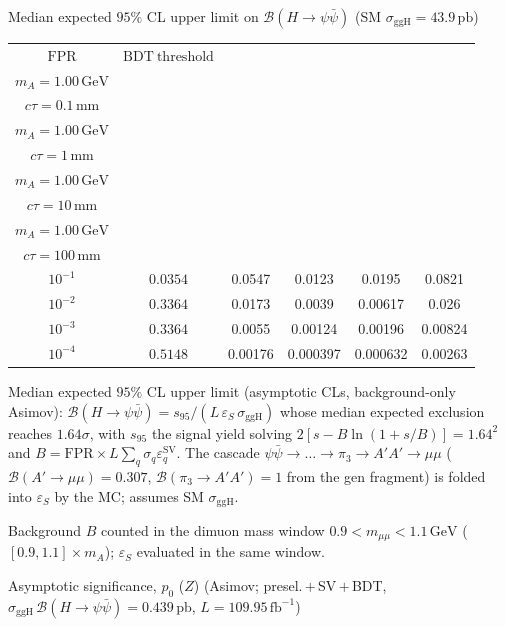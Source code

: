 \documentclass[10pt,a4paper]{article}
\begin{document}
{\vspace{12pt}

Median expected $95\%$ CL upper limit on $\mathcal{B}(H\to\psi\bar{\psi})$ (SM $\sigma_{\mathrm{ggH}}=43.9\,\mathrm{pb}$)

\begin{tabular}{cccccc}
\toprule
$\mathrm{FPR}$ & $\mathrm{BDT\ threshold}$ & \shortstack{$m_{\pi}=10\,\mathrm{GeV}$\\$m_{A}=1.00\,\mathrm{GeV}$\\$c\tau=0.1\,\mathrm{mm}$} & \shortstack{$m_{\pi}=10\,\mathrm{GeV}$\\$m_{A}=1.00\,\mathrm{GeV}$\\$c\tau=1\,\mathrm{mm}$} & \shortstack{$m_{\pi}=10\,\mathrm{GeV}$\\$m_{A}=1.00\,\mathrm{GeV}$\\$c\tau=10\,\mathrm{mm}$} & \shortstack{$m_{\pi}=10\,\mathrm{GeV}$\\$m_{A}=1.00\,\mathrm{GeV}$\\$c\tau=100\,\mathrm{mm}$} \\
\midrule
$10^{-1}$ & $0.0354$ & 0.0547 & 0.0123 & 0.0195 & 0.0821\\
$10^{-2}$ & $0.3364$ & 0.0173 & 0.0039 & 0.00617 & 0.026\\
$10^{-3}$ & $0.3364$ & 0.0055 & 0.00124 & 0.00196 & 0.00824\\
$10^{-4}$ & $0.5148$ & 0.00176 & 0.000397 & 0.000632 & 0.00263\\
\bottomrule
\end{tabular}

{\small Median expected $95\%$ CL upper limit (asymptotic CLs, background-only Asimov): $\mathcal{B}(H\to\psi\bar{\psi})=s_{95}/(L\,\varepsilon_S\,\sigma_{\mathrm{ggH}})$ whose median expected exclusion reaches $1.64\sigma$, with $s_{95}$ the signal yield solving $2[s-B\ln(1{+}s/B)]=1.64^2$ and $B=\mathrm{FPR}\times L\sum_q\sigma_q\varepsilon_q^{\mathrm{SV}}$. The cascade $\psi\bar{\psi}\to\ldots\to\pi_3\to A'A'\to\mu\mu$ ($\mathcal{B}(A'\to\mu\mu)=0.307$, $\mathcal{B}(\pi_3\to A'A')=1$ from the gen fragment) is folded into $\varepsilon_S$ by the MC; assumes SM $\sigma_{\mathrm{ggH}}$.}

{\small Background $B$ counted in the dimuon mass window $0.9<m_{\mu\mu}<1.1\,\mathrm{GeV}$ ($[0.9,1.1]\times m_A$); $\varepsilon_S$ evaluated in the same window.}

\vspace{12pt}

Asymptotic significance, $p_0$ ($Z$) (Asimov; presel.\,$+$\,SV\,$+$\,BDT, $\sigma_{\mathrm{ggH}}\,\mathcal{B}(H\to\psi\bar{\psi})=0.439\,\mathrm{pb}$, $L=109.95\,\mathrm{fb}^{-1}$)

}
\end{document}
